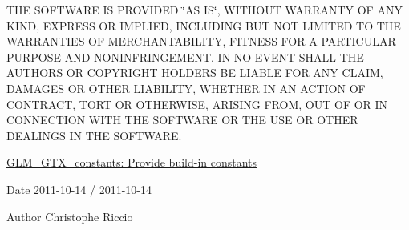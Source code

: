 \-T\-H\-E \-S\-O\-F\-T\-W\-A\-R\-E \-I\-S \-P\-R\-O\-V\-I\-D\-E\-D \char`\"{}\-A\-S I\-S\char`\"{}, \-W\-I\-T\-H\-O\-U\-T \-W\-A\-R\-R\-A\-N\-T\-Y \-O\-F \-A\-N\-Y \-K\-I\-N\-D, \-E\-X\-P\-R\-E\-S\-S \-O\-R \-I\-M\-P\-L\-I\-E\-D, \-I\-N\-C\-L\-U\-D\-I\-N\-G \-B\-U\-T \-N\-O\-T \-L\-I\-M\-I\-T\-E\-D \-T\-O \-T\-H\-E \-W\-A\-R\-R\-A\-N\-T\-I\-E\-S \-O\-F \-M\-E\-R\-C\-H\-A\-N\-T\-A\-B\-I\-L\-I\-T\-Y, \-F\-I\-T\-N\-E\-S\-S \-F\-O\-R \-A \-P\-A\-R\-T\-I\-C\-U\-L\-A\-R \-P\-U\-R\-P\-O\-S\-E \-A\-N\-D \-N\-O\-N\-I\-N\-F\-R\-I\-N\-G\-E\-M\-E\-N\-T. \-I\-N \-N\-O \-E\-V\-E\-N\-T \-S\-H\-A\-L\-L \-T\-H\-E \-A\-U\-T\-H\-O\-R\-S \-O\-R \-C\-O\-P\-Y\-R\-I\-G\-H\-T \-H\-O\-L\-D\-E\-R\-S \-B\-E \-L\-I\-A\-B\-L\-E \-F\-O\-R \-A\-N\-Y \-C\-L\-A\-I\-M, \-D\-A\-M\-A\-G\-E\-S \-O\-R \-O\-T\-H\-E\-R \-L\-I\-A\-B\-I\-L\-I\-T\-Y, \-W\-H\-E\-T\-H\-E\-R \-I\-N \-A\-N \-A\-C\-T\-I\-O\-N \-O\-F \-C\-O\-N\-T\-R\-A\-C\-T, \-T\-O\-R\-T \-O\-R \-O\-T\-H\-E\-R\-W\-I\-S\-E, \-A\-R\-I\-S\-I\-N\-G \-F\-R\-O\-M, \-O\-U\-T \-O\-F \-O\-R \-I\-N \-C\-O\-N\-N\-E\-C\-T\-I\-O\-N \-W\-I\-T\-H \-T\-H\-E \-S\-O\-F\-T\-W\-A\-R\-E \-O\-R \-T\-H\-E \-U\-S\-E \-O\-R \-O\-T\-H\-E\-R \-D\-E\-A\-L\-I\-N\-G\-S \-I\-N \-T\-H\-E \-S\-O\-F\-T\-W\-A\-R\-E.

\hyperlink{group__gtx__constants}{\-G\-L\-M\-\_\-\-G\-T\-X\-\_\-constants\-: \-Provide build-\/in constants}

\begin{DoxyDate}{\-Date}
2011-\/10-\/14 / 2011-\/10-\/14 
\end{DoxyDate}
\begin{DoxyAuthor}{\-Author}
\-Christophe \-Riccio 
\end{DoxyAuthor}
